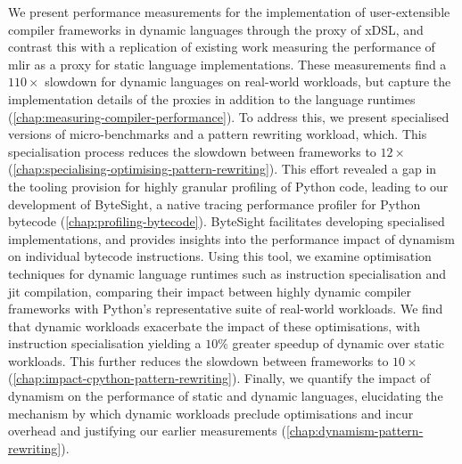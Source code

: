 We present performance measurements for the implementation of user-extensible compiler frameworks in dynamic languages through the proxy of xDSL, and contrast this with a replication of existing work measuring the performance of \ac{mlir} as a proxy for static language implementations. These measurements find a $110\times$ slowdown for dynamic languages on real-world workloads, but capture the implementation details of the proxies in addition to the language runtimes (\autoref{chap:measuring-compiler-performance}).
To address this, we present specialised versions of micro-benchmarks and a pattern rewriting workload, which. This specialisation process reduces the slowdown between frameworks to $12\times$ (\autoref{chap:specialising-optimising-pattern-rewriting}).
This effort revealed a gap in the tooling provision for highly granular profiling of Python code, leading to our development of ByteSight, a native tracing performance profiler for Python bytecode (\autoref{chap:profiling-bytecode}). ByteSight facilitates developing specialised implementations, and provides insights into the performance impact of dynamism on individual bytecode instructions.
Using this tool, we examine optimisation techniques for dynamic language runtimes such as instruction specialisation and \ac{jit} compilation, comparing their impact between highly dynamic compiler frameworks with Python's representative suite of real-world workloads. We find that dynamic workloads exacerbate the impact of these optimisations, with instruction specialisation yielding a $10\%$ greater speedup of dynamic over static workloads. This further reduces the slowdown between frameworks to $10\times$ (\autoref{chap:impact-cpython-pattern-rewriting}).
Finally, we quantify the impact of dynamism on the performance of static and dynamic languages, elucidating the mechanism by which dynamic workloads preclude optimisations and incur overhead and justifying our earlier measurements (\autoref{chap:dynamism-pattern-rewriting}).


